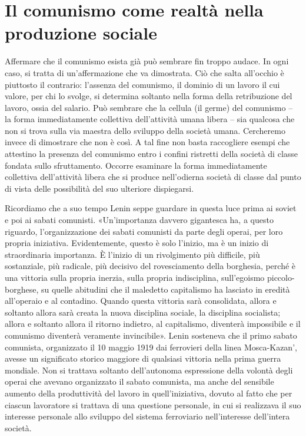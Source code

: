 \documentclass[../main]{subfiles}
\begin{document}
\ifSubfilesClassLoaded{\setcounter{page}{19}}{}
\section{Il comunismo come realtà nella produzione sociale}
\label{sec:04_comunismo_realta}

Affermare che il comunismo esista già può sembrare fin troppo audace. In ogni caso, si tratta di un'affermazione che va dimostrata. Ciò che salta all'occhio è piuttosto il contrario: l'assenza del comunismo, il dominio di un lavoro il cui valore, per chi lo svolge, si determina soltanto nella forma della retribuzione del lavoro, ossia del salario. Può sembrare che la cellula (il germe) del comunismo – la forma immediatamente collettiva dell'attività umana libera – sia qualcosa che non si trova sulla via maestra dello sviluppo della società umana. Cercheremo invece di dimostrare che non è così. A tal fine non basta raccogliere esempi che attestino la presenza del comunismo entro i confini ristretti della società di classe fondata sullo sfruttamento. Occorre esaminare la forma immediatamente collettiva dell'attività libera che si produce nell'odierna società di classe dal punto di vista delle possibilità del suo ulteriore dispiegarsi.

Ricordiamo che a suo tempo Lenin seppe guardare in questa luce prima ai soviet e poi ai sabati comunisti. «Un'importanza davvero gigantesca ha, a questo riguardo, l'organizzazione dei sabati comunisti da parte degli operai, per loro propria iniziativa. Evidentemente, questo è solo l'inizio, ma è un inizio di straordinaria importanza. È l'inizio di un rivolgimento più difficile, più sostanziale, più radicale, più decisivo del rovesciamento della borghesia, perché è una vittoria sulla propria inerzia, sulla propria indisciplina, sull'egoismo piccolo-borghese, su quelle abitudini che il maledetto capitalismo ha lasciato in eredità all'operaio e al contadino. Quando questa vittoria sarà consolidata, allora e soltanto allora sarà creata la nuova disciplina sociale, la disciplina socialista; allora e soltanto allora il ritorno indietro, al capitalismo, diventerà impossibile e il comunismo diventerà veramente invincibile». Lenin sosteneva che il primo sabato comunista, organizzato il 10 maggio 1919 dai ferrovieri della linea Mosca-Kazan', avesse un significato storico maggiore di qualsiasi vittoria nella prima guerra mondiale. Non si trattava soltanto dell'autonoma espressione della volontà degli operai che avevano organizzato il sabato comunista, ma anche del sensibile aumento della produttività del lavoro in quell'iniziativa, dovuto al fatto che per ciascun lavoratore si trattava di una questione personale, in cui si realizzava il suo interesse personale allo sviluppo del sistema ferroviario nell'interesse dell'intera società.
\end{document}
